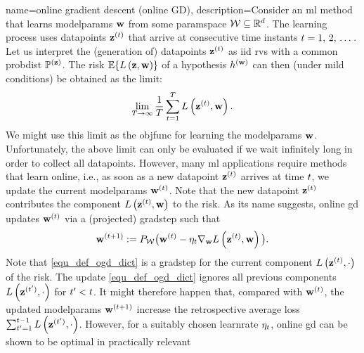 {name={online gradient descent (online GD)}, 
	description={Consider  an \gls{ml} 
		method that learns \glspl{modelparam} ${\bf w}$ from some 
		\gls{paramspace} $\mathcal{W} \subseteq \mathbb{R}^{d}$. 
		The learning process uses \glspl{datapoint} ${\bf z}^{(t)}$ 
		that arrive at consecutive time instants $t=1, \,2, \,\dots$. 
		Let us interpret the (generation of) \glspl{datapoint} ${\bf z}^{(t)}$ 
		as \gls{iid} \glspl{rv} with a common \gls{probdist} $\mathbb{P}^{({\bf z})}$. 
		The \gls{risk} $\mathbb{E}\{ L\left({\bf z},{\bf w} \right) \}$ of a 
		\gls{hypothesis} $h^{({\bf w})}$ can then (under mild conditions) 
		be obtained as the limit:
		$$\lim_{T\rightarrow \infty} \frac{1}{T}\sum_{t=1}^{T} L\left({\bf z}^{(t)},{\bf w} \right).$$ 
		We might use this limit as the \gls{objfunc} for learning the 
		\glspl{modelparam} ${\bf w}$. Unfortunately, the above limit can 
		only be evaluated if we wait infinitely long in order to collect all \glspl{datapoint}. 
		However, many \gls{ml} applications require methods that learn online, i.e.,
		as soon as a new \gls{datapoint} ${\bf z}^{(t)}$ arrives at 
		time $t$, we update the current \glspl{modelparam} ${\bf w}^{(t)}$. 
		Note that the new \gls{datapoint} ${\bf z}^{(t)}$ contributes 
		the component $L\left({\bf z}^{(t)},{\bf w} \right)$ to the \gls{risk}. 
		As its name suggests, online \gls{gd} updates ${\bf w}^{(t)}$ via 
		a (projected) \gls{gradstep} such that
		\begin{equation} 
			\label{equ_def_ogd_dict}
 			{\bf w}^{(t+1)} := P_{\mathcal{W}}\big( {\bf w}^{(t)} - \eta_{t} \nabla_{{\bf w}} L\left({\bf z}^{(t)},{\bf w} \right)\big). 
		\end{equation} 
		Note that \eqref{equ_def_ogd_dict} is a \gls{gradstep} for the 
		current component $L\left({\bf z}^{(t)},\cdot \right)$ 
		of the \gls{risk}. The update \eqref{equ_def_ogd_dict} ignores all 
		previous components $L\left({\bf z}^{(t')},\cdot \right)$
		for $t' < t$. It might therefore happen that, compared 
		with ${\bf w}^{(t)}$, the updated \glspl{modelparam} 
		${\bf w}^{(t+1)}$ increase the retrospective average 
		\gls{loss} $\sum_{t'=1}^{t-1} L\left({\bf z}^{(t')},\cdot \right)$. 
		However, for a suitably chosen \gls{learnrate} $\eta_{t}$, 
		online \gls{gd} can be shown to be optimal in practically relevant 
}}
